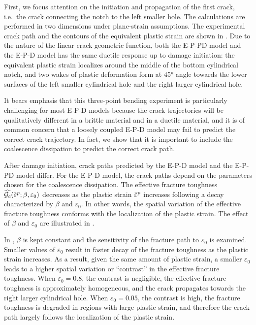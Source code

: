 First, we focus attention on the initiation and propagation of the first crack, i.e.\ the crack connecting the notch to the left smaller hole. The calculations are performed in two dimensions under plane-strain assumptions. The experimental crack path and the contours of the equivalent plastic strain are shown in . Due to the nature of the linear crack geometric function, both the E-P-PD model and the E-P-D model has the same ductile response up to damage initiation: the equivalent plastic strain localizes around the middle of the bottom cylindrical notch, and two wakes of plastic deformation form at $\ang{45}$ angle towards the lower surfaces of the left smaller cylindrical hole and the right larger cylindrical hole.



It bears emphasis that this three-point bending experiment is particularly challenging for most E-P-D models because the crack trajectories will be qualitatively different in a brittle material and in a ductile material, and it is of common concern that a loosely coupled E-P-D model may fail to predict the correct crack trajectory. In fact, we show that it is important to include the coalescence dissipation to predict the correct crack path.

After damage initiation, crack paths predicted by the E-P-D model and the E-P-PD model differ. For the E-P-D model, the crack paths depend on the parameters chosen for the coalescence dissipation. The effective fracture toughness $\widehat{\Gc}(\ep;\beta, \varepsilon_0)$ decreases as the plastic strain $\ep$ increases following a decay characterized by $\beta$ and $\varepsilon_0$. In other words, the spatial variation of the effective fracture toughness conforms with the localization of the plastic strain.
The effect of $\beta$ and $\varepsilon_0$ are illustrated in .



In , $\beta$ is kept constant and the sensitivity of the fracture path to $\varepsilon_0$ is examined. Smaller values of $\varepsilon_0$ result in faster decay of the fracture toughness as the plastic strain increases. As a result, given the same amount of plastic strain, a smaller $\varepsilon_0$ leads to a higher spatial variation or ``contrast'' in the effective fracture toughness. When $\varepsilon_0 = 0.8$, the contrast is negligible, the effective fracture toughness is approximately homogeneous, and the crack propagates towards the right larger cylindrical hole. When $\varepsilon_0=0.05$, the contrast is high, the fracture toughness is degraded in regions with large plastic strain, and therefore the crack path largely follows the localization of the plastic strain.

